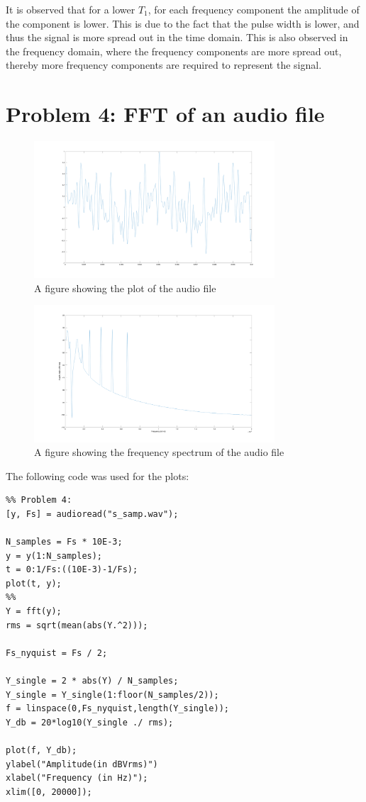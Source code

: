 It is observed that for a lower $T_1$, for each frequency component the amplitude of the component is lower. This is due to the fact that the pulse width is lower, and thus the signal is more spread out in the time domain. This is also observed in the frequency domain, where the frequency components are more spread out, thereby more frequency components are required to represent the signal.

\section{Problem 4: FFT of an audio file}

\begin{figure}[H]
    \centering
    \includegraphics[width=0.8\textwidth]{images/prelab_problem_4_time.png}
    \caption{A figure showing the plot of the audio file}
\end{figure}
\begin{figure}[H]
    \centering
    \includegraphics[width=0.8\textwidth]{images/prelab_problem_4_freq.png}
    \caption{A figure showing the frequency spectrum of the audio file}
\end{figure}

The following code was used for the plots:
\vspace{1cm}
\begin{verbatim}
%% Problem 4:
[y, Fs] = audioread("s_samp.wav");

N_samples = Fs * 10E-3;
y = y(1:N_samples);
t = 0:1/Fs:((10E-3)-1/Fs);
plot(t, y);
%% 
Y = fft(y);
rms = sqrt(mean(abs(Y.^2)));

Fs_nyquist = Fs / 2; 

Y_single = 2 * abs(Y) / N_samples;
Y_single = Y_single(1:floor(N_samples/2));
f = linspace(0,Fs_nyquist,length(Y_single));
Y_db = 20*log10(Y_single ./ rms);

plot(f, Y_db);
ylabel("Amplitude(in dBVrms)")
xlabel("Frequency (in Hz)");
xlim([0, 20000]);
\end{verbatim}

